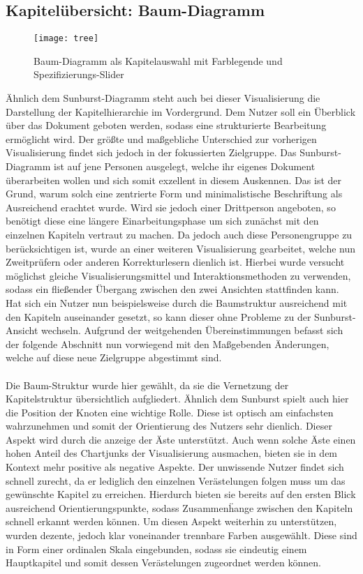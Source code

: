 \subsection{Kapitel\"ubersicht: Baum-Diagramm} \label{subsec:tree}
\begin{figure}[!htbp]
 \centering
 \texttt{[image: tree]}
 \caption{Baum-Diagramm als Kapitelauswahl mit Farblegende und Spezifizierungs-Slider}
 \label{fig:tree}
\end{figure}
\"Ahnlich dem Sunburst-Diagramm steht auch bei dieser Visualisierung die Darstellung der Kapitelhierarchie im Vordergrund. Dem Nutzer soll ein \"Uberblick \"uber das Dokument geboten werden, sodass eine strukturierte Bearbeitung erm\"oglicht wird. Der gr\"o{\ss}te und ma{\ss}gebliche Unterschied zur vorherigen Visualisierung findet sich jedoch in der fokussierten Zielgruppe. Das Sunburst-Diagramm ist auf jene Personen ausgelegt, welche ihr eigenes Dokument \"uberarbeiten wollen und sich somit exzellent in diesem Auskennen. Das ist der Grund, warum solch eine zentrierte Form und minimalistische Beschriftung als Ausreichend erachtet wurde. Wird sie jedoch einer Drittperson angeboten, so ben\"otigt diese eine l\"angere Einarbeitungsphase um sich zun\"achst mit den einzelnen Kapiteln vertraut zu machen. Da jedoch auch diese Personengruppe zu ber\"ucksichtigen ist, wurde an einer weiteren Visualisierung gearbeitet, welche nun Zweitpr\"ufern oder anderen Korrekturlesern dienlich ist. Hierbei wurde versucht m\"oglichst gleiche Visualisierungsmittel und Interaktionsmethoden zu verwenden, sodass ein flie{\ss}ender \"Ubergang zwischen den zwei Ansichten stattfinden kann. Hat sich ein Nutzer nun beispielsweise durch die Baumstruktur ausreichend mit den Kapiteln auseinander gesetzt, so kann dieser ohne Probleme zu der Sunburst-Ansicht wechseln. Aufgrund der weitgehenden \"Ubereinstimmungen befasst sich der folgende Abschnitt nun vorwiegend mit den Ma{\ss}gebenden \"Anderungen, welche auf diese neue Zielgruppe abgestimmt sind.\\
\\
Die Baum-Struktur wurde hier gew\"ahlt, da sie die Vernetzung der Kapitelstruktur \"ubersichtlich aufgliedert. \"Ahnlich dem Sunburst spielt auch hier die Position der Knoten eine wichtige Rolle. Diese ist optisch am einfachsten wahrzunehmen und somit der Orientierung des Nutzers sehr dienlich. Dieser Aspekt wird durch die anzeige der \"Aste unterst\"utzt. Auch wenn solche \"Aste einen hohen Anteil des Chartjunks der Visualisierung ausmachen, bieten sie in dem Kontext mehr positive als negative Aspekte. Der unwissende Nutzer findet sich schnell zurecht, da er lediglich den einzelnen Ver\"astelungen folgen muss um das gew\"unschte Kapitel zu erreichen. Hierdurch bieten sie bereits auf den ersten Blick ausreichend Orientierungspunkte, sodass Zusammen\"hange zwischen den Kapiteln schnell erkannt werden k\"onnen. Um diesen Aspekt weiterhin zu unterst\"utzen, wurden dezente, jedoch klar voneinander trennbare Farben ausgew\"ahlt. Diese sind in Form einer ordinalen Skala eingebunden, sodass sie eindeutig einem Hauptkapitel und somit dessen Ver\"astelungen zugeordnet werden k\"onnen.\\
